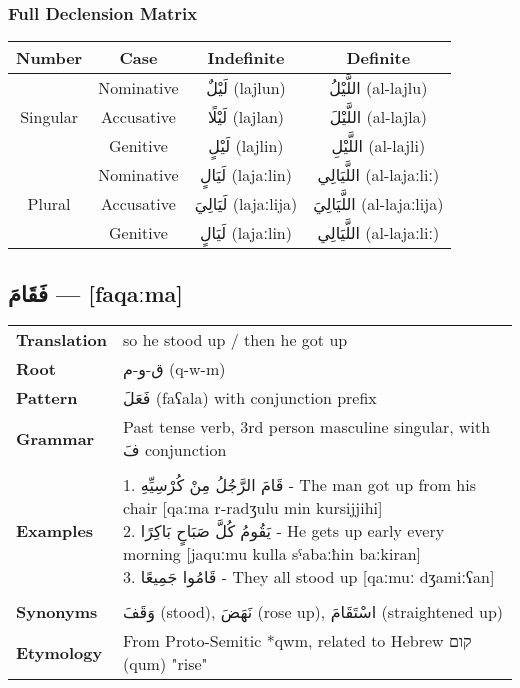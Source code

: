 \documentclass[letter,12pt]{article}
\begin{document}
\subsubsection*{Full Declension Matrix}
\begin{tabular}{|c|c|c|c|}
\hline
\textbf{Number} & \textbf{Case} & \textbf{Indefinite} & \textbf{Definite} \\
\hline
\multirow{3}{*}{Singular}
 & Nominative   & \textarabic{لَيْلٌ} (lajlun) & \textarabic{اللَّيْلُ} (al-lajlu) \\
 & Accusative   & \textarabic{لَيْلًا} (lajlan) & \textarabic{اللَّيْلَ} (al-lajla) \\
 & Genitive     & \textarabic{لَيْلٍ} (lajlin) & \textarabic{اللَّيْلِ} (al-lajli) \\
\hline
\multirow{3}{*}{Plural}
 & Nominative   & \textarabic{لَيَالٍ} (lajaːlin) & \textarabic{اللَّيَالِي} (al-lajaːliː) \\
 & Accusative   & \textarabic{لَيَالِيَ} (lajaːlija) & \textarabic{اللَّيَالِيَ} (al-lajaːlija) \\
 & Genitive     & \textarabic{لَيَالٍ} (lajaːlin) & \textarabic{اللَّيَالِي} (al-lajaːliː) \\
\hline
\end{tabular}

\subsection{\textarabic{فَقَامَ} — [faqaːma]}
\begin{tabular}{p{3cm}p{10cm}}
\toprule
\textbf{Translation} & so he stood up / then he got up \\
\textbf{Root} & \textarabic{ق-و-م} (q-w-m) \\
\textbf{Pattern} & \textarabic{فَعَلَ} (faʕala) with conjunction prefix \\
\textbf{Grammar} & Past tense verb, 3rd person masculine singular, with \textarabic{فَ} conjunction \\
\midrule \\
\textbf{Examples} & \makecell[l]{\parbox{9.5cm}{
1. \textarabic{قَامَ الرَّجُلُ مِنْ كُرْسِيِّهِ} - The man got up from his chair [qaːma r-radʒulu min kursijjihi]\\
2. \textarabic{يَقُومُ كُلَّ صَبَاحٍ بَاكِرًا} - He gets up early every morning [jaquːmu kulla sˤabaːħin baːkiran]\\
3. \textarabic{قَامُوا جَمِيعًا} - They all stood up [qaːmuː dʒamiːʕan]
}} \\
\midrule \\
\textbf{Synonyms} & \textarabic{وَقَفَ} (stood), \textarabic{نَهَضَ} (rose up), \textarabic{اسْتَقَامَ} (straightened up) \\
\textbf{Etymology} & From Proto-Semitic *qwm, related to Hebrew \texthebrew{קום} (qum) "rise" \\
\bottomrule
\end{tabular}
\end{document}
